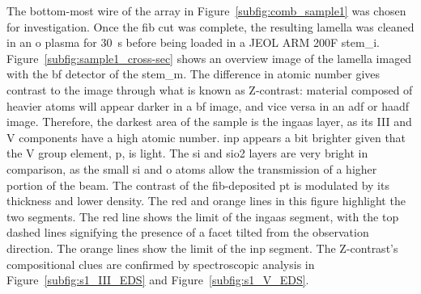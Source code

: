 The bottom-most wire of the array in Figure~\ref{subfig:comb_sample1} was chosen for investigation. Once the \acs{fib} cut was complete, the resulting lamella was cleaned in an \acl{o} plasma for \qty{30}{s} before being loaded in a JEOL ARM 200F \acl{stem_i}. Figure~\ref{subfig:sample1_cross-sec} shows an overview image of the lamella imaged with the \acf{bf} detector of the \acs{stem_m}. The difference in atomic number gives contrast to the image through what is known as Z-contrast: material composed of heavier atoms will appear darker in a \acs{bf} image, and vice versa in an \acf{adf} or \acf{haadf} image. Therefore, the darkest area of the sample is the \acs{ingaas} layer, as its III and V components have a high atomic number. \acs{inp} appears a bit brighter given that the V group element, \acl{p}, is light. The \acl{si} and \acs{sio2} layers are very bright in comparison, as the small \acl{si} and \acl{o} atoms allow the transmission of a higher portion of the beam. The contrast of the \acs{fib}-deposited \acl{pt} is modulated by its thickness and lower density. The red and orange lines in this figure highlight the two segments. The red line shows the limit of the \acs{ingaas} segment, with the top dashed lines signifying the presence of a facet tilted from the observation direction. The orange lines show the limit of the \acs{inp} segment. The Z-contrast's compositional clues are confirmed by spectroscopic analysis in Figure~\ref{subfig:s1_III_EDS} and Figure~\ref{subfig:s1_V_EDS}. 
\par

